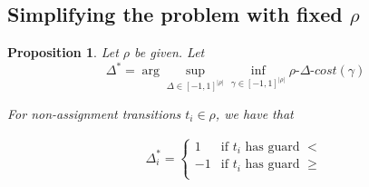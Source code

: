 \documentclass{article}
\newtheorem{proposition}{Proposition}[section]
\newtheorem{corollary}{Corollary}[theorem]
\newtheorem{definition}{Definition}[section]
\renewcommand{\epsilon}{\varepsilon}
\newcommand{\1}{\langle 1 \rangle}
\newcommand{\2}{\langle 2 \rangle}
\begin{document}






\subsection{Simplifying the problem with fixed $\rho$}

\begin{proposition}
    \label{prop:deltas_non_assignment}
    Let $\rho$ be given. Let \[\Delta^* = \arg \sup_{\Delta \in [-1, 1]^{|\rho|}} \inf_{\gamma \in [-1, 1]^{|\rho|}} \rho\text{-}\Delta\text{-}cost (\gamma)\]
    
    For non-assignment transitions $t_i \in \rho$, we have that 

    \begin{align*}
        \Delta_i^* = \begin{cases}
            1 & \text{if } t_i \text{ has guard } < \\
            -1 & \text{if } t_i \text{ has guard } \geq \\
        \end{cases}
    \end{align*}
\end{proposition}
\end{document}
